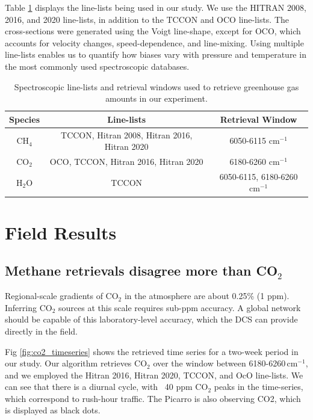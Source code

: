 \documentclass[amt, manuscript]{copernicus}
\begin{document}
Table \ref{tab:1} displays the line-lists being used in our study. We use the HITRAN 2008, 2016, and 2020 line-lists, in addition to the TCCON and OCO line-lists. The cross-sections were generated using the Voigt line-shape, except for OCO, which accounts for velocity changes, speed-dependence, and line-mixing. Using multiple line-lists enables us to quantify how biases vary with pressure and temperature in the most commonly used spectroscopic databases.


\begin{table}
  \centering
  \begin{tabular}{| c | c | c |}
    Species & Line-lists & Retrieval Window \\
    \hline
    CH$_4$ & TCCON, Hitran 2008, Hitran 2016, Hitran 2020 & 6050-6115 cm$^{-1}$ \\
    CO$_2$ & OCO, TCCON, Hitran 2016, Hitran 2020 & 6180-6260 cm$^{-1}$ \\
    H$_2$O & TCCON & 6050-6115, 6180-6260 cm$^{-1}$ \\
    \hline
    
  \end{tabular}
  \caption{Spectroscopic line-lists and retrieval windows used to retrieve greenhouse gas amounts in our experiment.}
  
  \label{tab:1}
\end{table}

\section{Field Results}
\subsection{Methane retrievals disagree more than CO$_2$}

Regional-scale gradients of CO$_2$ in the atmosphere are about 0.25\% (1 ppm). Inferring CO$_2$ sources at this scale requires sub-ppm accuracy. A global network should be capable of this laboratory-level accuracy, which the DCS can provide directly in the field.

Fig \ref{fig:co2_timeseries} shows the retrieved time series for a two-week period in our study. Our algorithm retrieves CO$_2$ over the window between 6180-6260\,cm$^{-1}$, and we employed the Hitran 2016, Hitran 2020, TCCON, and OcO line-lists. We can see that there is a diurnal cycle, with ~40 ppm CO$_2$ peaks in the time-series, which correspond to rush-hour traffic. The Picarro is also observing CO2, which is displayed as black dots.
\end{document}
